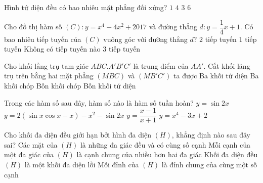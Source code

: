 \begin{ex}%
Hình tứ diện đều có bao nhiêu mặt phẳng đối xứng?
\choice
{$1$}
{$4$}
{$3$}
{\True $6$}
\end{ex}

\begin{ex}%
Cho đồ thị hàm số $(C):y=x^4-4x^2+2017$ và đường thẳng $d : y= \dfrac{1}{4} x +1$. Có bao nhiêu tiếp tuyến của $(C)$ vuông góc với đường thẳng $d$?
\choice
{$2$ tiếp tuyến}
{$1$ tiếp tuyến}
{Không có tiếp tuyến nào}
{\True $3$ tiếp tuyến}
\end{ex}

\begin{ex}%
Cho khối lẳng trụ tam giác $ABC.A'B'C'$ là trung điểm của $AA'$. Cắt khối lăng trụ trên bằng hai mặt phẳng $(MBC)$ và $(MB'C')$ ta được 
\choice
{Ba khối tứ diện}
{\True Ba khối chóp}
{Bốn khối chóp}
{Bốn khối tứ diện}
\end{ex}

\begin{ex}%
Trong các hàm số sau đây, hàm số nào là hàm số tuần hoàn?
\choice
{\True $y=\sin 2x$}
{$y=2(\sin x \cos x -x) -x^2-\sin 2x$}
{$y=\dfrac{x-1}{x+1}$}
{$y=x^4-3x+2$}
\end{ex}

\begin{ex}%
Cho khối đa diện đều giới hạn bởi hình đa diện $(H)$, khẳng định nào sau đây sai?
\choice
{Các mặt của $(H)$ là những đa giác đều và có cùng số cạnh}
{\True Mỗi cạnh của một đa giác của $(H)$ là cạnh chung của nhiều hơn hai đa giác}
{Khối đa diện đều $(H)$ là một khối đa diện lồi}
{Mỗi đỉnh của $(H)$ là đỉnh chung của cùng một số cạnh}
\end{ex}


